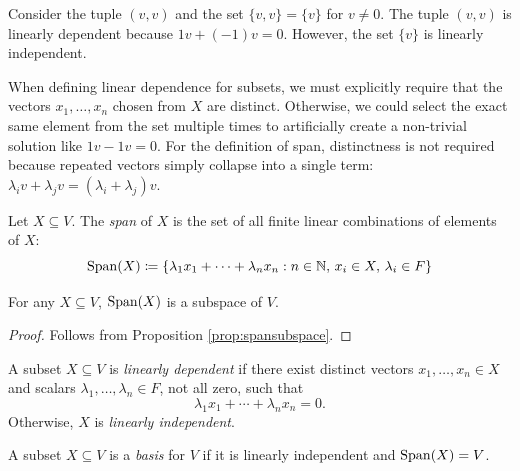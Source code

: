 \documentclass[../linear_algebra_and_groups.tex]{subfiles}
\begin{document}
\begin{remark}
    Consider the tuple $(v,v)$ and the set $\{v,v\} = \{v\}$ for $v \neq 0$. 
    The tuple $(v,v)$ is linearly dependent because $1v + (-1)v = 0$. However, the set $\{v\}$ is linearly independent. 
    
    When defining linear dependence for subsets, we must explicitly require that the vectors $x_1, \dots, x_n$ chosen from $X$ are distinct. Otherwise, we could select the exact same element from the set multiple times to artificially create a non-trivial solution like $1v - 1v = 0$. For the definition of span, distinctness is not required because repeated vectors simply collapse into a single term: $\lambda_i v + \lambda_j v = (\lambda_i + \lambda_j)v$.
\end{remark}

\begin{definition}
    \begin{shaded*}
        Let $X \subseteq V$. The \textit{span} of $X$ is the set of all finite linear combinations of elements of $X$:
        \[ \operatorname{Span}(X) \coloneqq \{\lambda_1x_1+\cdots+\lambda_nx_n : n\in\mathbb{N},\, x_i\in X,\, \lambda_i\in F\} \]
    \end{shaded*}
\end{definition}

\begin{lemma}
    \begin{shaded*}
        For any $X \subseteq V$, $\operatorname{Span}(X)$ is a subspace of $V$.
    \end{shaded*}
\end{lemma}
\begin{proof}
    Follows from Proposition \ref{prop:spansubspace}.
\end{proof}

\begin{definition}
    \begin{shaded*}
        A subset $X \subseteq V$ is \textit{linearly dependent} if there exist distinct vectors $x_1,\dots,x_n \in X$ and scalars $\lambda_1,\dots,\lambda_n \in F$, not all zero, such that
        \[ \lambda_1x_1+\cdots+\lambda_nx_n=0. \]
        Otherwise, $X$ is \textit{linearly independent}.
    \end{shaded*}
\end{definition}

\begin{definition}
    \begin{shaded*}
        A subset $X \subseteq V$ is a \textit{basis} for $V$ if it is linearly independent and $\operatorname{Span}(X)=V$.
    \end{shaded*}
\end{definition}
\end{document}
